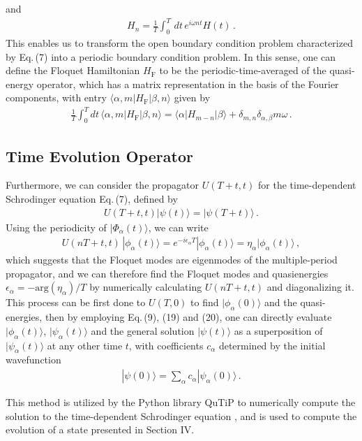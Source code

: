 \documentclass[reprint, amsmath, amssymb, aps]{revtex4-2}
\begin{document}
and 
\begin{align}
H_n =\frac{1}{T}\int_0^T\, dt\,
e^{i\omega n t}H(t)\,. 
\end{align}
This enables us to transform the open boundary condition problem characterized by Eq.\,(7) into a periodic boundary condition problem. In this sense, one can define the Floquet Hamiltonian $H_{\text{F}}$ to be the periodic-time-averaged of the quasi-energy operator, which has a matrix representation in the basis of the Fourier components, with entry $\langle \alpha, m |H_{\text{F}}|\beta, n\rangle$ given by
\begin{align}
\frac{1}{T}\int_0^Tdt\, \langle \alpha, m | H_{\text{F}} | \beta, n\rangle  = \langle \alpha | H_{m-n} | \beta \rangle + \delta_{m,n}\delta_{\alpha,\beta}m \omega\,.
\end{align}
\subsection{Time Evolution Operator}
Furthermore, we can consider the propagator $U(T+t,t)$ for the time-dependent Schrodinger equation Eq.\,(7), defined by 
\begin{align}
U(T+t,t)|\psi(t)\rangle = |\psi(T+t)\rangle\,.
\end{align}
Using the periodicity of $|\Phi_\alpha(t)\rangle$, we can write
\begin{align}
U(nT+t,t)\, |\phi_\alpha(t)\rangle = e^{-i\epsilon_\alpha T}|\phi_\alpha(t)\rangle = \eta_\alpha |\phi_\alpha(t)\rangle\,,
\end{align}
which suggests that the Floquet modes are eigenmodes of the multiple-period propagator, and we can therefore find the Floquet modes and quasienergies $\epsilon_\alpha = -\text{arg}(\eta_\alpha)/T$ by numerically calculating $U(nT+t,t)$ and diagonalizing it. This process can be first done to $U(T,0)$ to find $|\phi_\alpha(0)\rangle$ and the quasi-energies, then by employing Eq.\,(9), (19) and (20), one can directly evaluate $|\phi_\alpha(t)\rangle$, $|\psi_\alpha(t)\rangle$ and the general solution $|\psi(t)\rangle$ as a superposition of $|\psi_\alpha(t)\rangle$ at any other time $t$, with coefficients $c_\alpha$ determined by the initial wavefunction 
\begin{align}
|\psi(0)\rangle = \sum_\alpha c_\alpha |\psi_\alpha(0)\rangle\,.
\end{align}

This method is utilized by the Python library QuTiP to numerically compute the solution to the time-dependent Schrodinger equation \cite{QuTiP}, and is used to compute the evolution of a state presented in Section IV.
\end{document}
